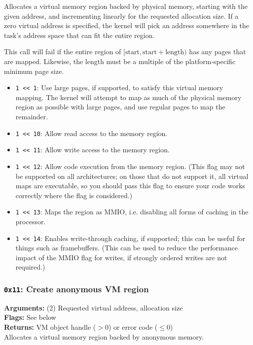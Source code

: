 \documentclass[11pt]{article}
\begin{document}
Allocates a virtual memory region backed by physical memory, starting with the given address, and incrementing linearly for the requested allocation size.  If a zero virtual address is specified, the kernel will pick an address somewhere in the task's address space that can fit the entire region.

This call will fail if the entire region of $[\text{start}, \text{start} + \text{length})$ has any pages that are mapped. Likewise, the length must be a multiple of the platform-specific minimum page size.

\begin{itemize}
\item \texttt{1 << 1}: Use large pages, if supported, to satisfy this virtual memory mapping. The kernel will attempt to map as much of the physical memory region as possible with large pages, and use regular pages to map the remainder.
\item \texttt{1 << 10}: Allow read access to the memory region.
\item \texttt{1 << 11}: Allow write access to the memory region.
\item \texttt{1 << 12}: Allow code execution from the memory region. (This flag may not be supported on all architectures; on those that do not support it, all virtual maps are executable, so you should pass this flag to ensure your code works correctly where the flag is considered.)
\item \texttt{1 << 13}: Maps the region as MMIO, i.e. disabling all forms of caching in the processor.
\item \texttt{1 << 14}: Enables write-through caching, if supported; this can be useful for things such as framebuffers. (This can be used to reduce the performance impact of the MMIO flag for writes, if strongly ordered writes are not required.)
\end{itemize}

\subsubsection{{\tt 0x11}: Create anonymous VM region}
\textbf{Arguments:} (2) Requested virtual address, allocation size  \\
\textbf{Flags:} See below \\
\textbf{Returns:} VM object handle ($>0$) or error code ($\leq0$) \\

Allocates a virtual memory region backed by anonymous memory.
\end{document}
